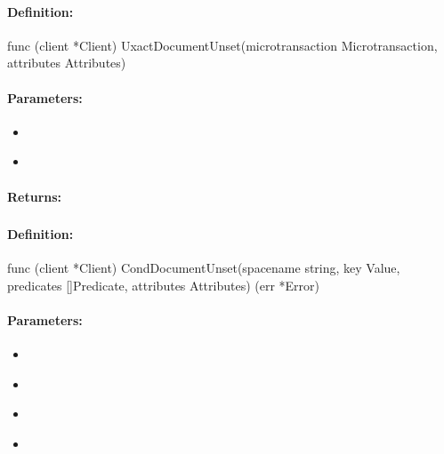 \paragraph{Definition:}
\begin{gocode}
func (client *Client) UxactDocumentUnset(microtransaction Microtransaction, attributes Attributes)
\end{gocode}

\paragraph{Parameters:}
\begin{itemize}[noitemsep]
\item {}\\

\item {}\\

\end{itemize}

\paragraph{Returns:}


\pagebreak
\subsubsection{}
\label{api:Go:CondDocumentUnset}


\paragraph{Definition:}
\begin{gocode}
func (client *Client) CondDocumentUnset(spacename string, key Value, predicates []Predicate, attributes Attributes) (err *Error)
\end{gocode}

\paragraph{Parameters:}
\begin{itemize}[noitemsep]
\item {}\\

\item {}\\

\item {}\\

\item {}\\

\end{itemize}

